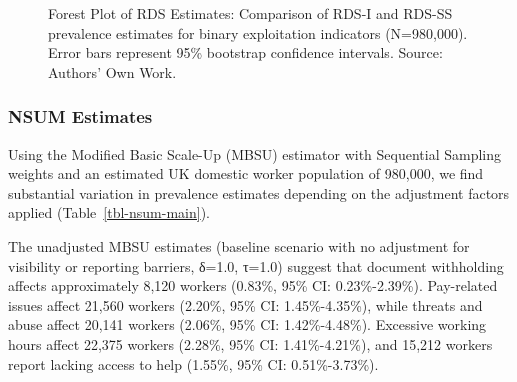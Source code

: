 \documentclass[
  12pt,
  letterpaper,
  DIV=11,
  numbers=noendperiod]{scrartcl}
\theoremstyle{plain}
\theoremstyle{definition}
\begin{document}
\begin{figure}[H]


\caption{\label{fig-rds-forest-plot}Forest Plot of RDS Estimates:
Comparison of RDS-I and RDS-SS prevalence estimates for binary
exploitation indicators (N=980,000). Error bars represent 95\% bootstrap
confidence intervals. Source: Authors' Own Work.}

\end{figure}%

\subsubsection{NSUM Estimates}\label{nsum-estimates}

Using the Modified Basic Scale-Up (MBSU) estimator with Sequential
Sampling weights and an estimated UK domestic worker population of
980,000, we find substantial variation in prevalence estimates depending
on the adjustment factors applied (Table~\ref{tbl-nsum-main}).

The unadjusted MBSU estimates (baseline scenario with no adjustment for
visibility or reporting barriers, δ=1.0, τ=1.0) suggest that document
withholding affects approximately 8,120 workers (0.83\%, 95\% CI:
0.23\%-2.39\%). Pay-related issues affect 21,560 workers (2.20\%, 95\%
CI: 1.45\%-4.35\%), while threats and abuse affect 20,141 workers
(2.06\%, 95\% CI: 1.42\%-4.48\%). Excessive working hours affect 22,375
workers (2.28\%, 95\% CI: 1.41\%-4.21\%), and 15,212 workers report
lacking access to help (1.55\%, 95\% CI: 0.51\%-3.73\%).
\end{document}
